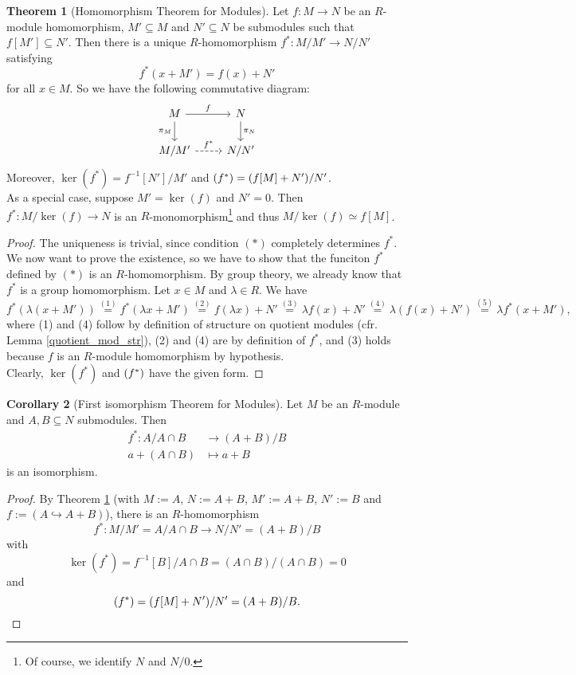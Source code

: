 \documentclass[12pt,a4paper]{report}
\theoremstyle{definition}
\newtheorem{theorem}{Theorem}[chapter] %
\newtheorem{corollary}[theorem]{Corollary} %
\theoremstyle{num.custom-title}
\let\o\relax %
\DeclareMathOperator{\o}{\mathsf{o}}
\let\Im\relax %
\DeclareMathOperator{\Im}{Im}
\DeclareMathOperator{\sse}{\subseteq}
\begin{document}
\begin{theorem}[Homomorphism Theorem for Modules]\label{mod-hom-thm}
Let $f: M \to N$ be an $R$-module homomorphism, $M' \sse M$ and $N' \sse N$ be submodules such that $f[M'] \sse N'$. Then there is a unique $R$-homomorphism  $f^*: M/M' \to N/N'$ satisfying 
\[
f^*(x+M') = f(x)+N' \tag{$*$}
\]
for all $x \in M$. So we have the following commutative diagram:
\[
\begin{tikzcd}
M \arrow{r}{f} \arrow[swap]{d}{\pi_M} & N \arrow{d}{\pi_N} \\
M/M' \arrow[dashrightarrow]{r}{f^*} & N/N' 
\end{tikzcd} 
\]
Moreover, $\ker(f^*) = f^{-1}[N']/M'$ and $\Im(f^*) = (f[M]+N')/N'$.\\
As a special case, suppose $M'=\ker(f)$ and $N'=0$. Then $f^*: M/\ker(f) \to N$ is an $R$-monomorphism\footnote{Of course, we identify $N$ and $N/0$.} and thus $M/\ker(f) \simeq f[M]$.
\begin{proof}
The uniqueness is trivial, since condition $(*)$ completely determines $f^*$.\\
We now want to prove the existence, so we have to show that the funciton $f^*$ defined by $(*)$ is an $R$-homomorphism. By group theory, we already know that $f^*$ is a group homomorphism. Let $x \in M$ and $\lambda \in R$. We have
\[
f^*(\lambda(x+M')) \stackrel{(1)}{=} f^*(\lambda x+M') \stackrel{(2)}{=} f(\lambda x)+N' \stackrel{(3)}{=} \lambda f(x)+N' \stackrel{(4)}{=} \lambda(f(x)+N') \stackrel{(5)}{=} \lambda f^*(x+M'),
\]
where (1) and (4) follow by definition of structure on quotient modules (cfr. Lemma \ref{quotient_mod_str}), (2) and (4) are by definition of $f^*$, and (3) holds because $f$ is an $R$-module homomorphism by hypothesis.\\
Clearly, $\ker(f^*)$ and $\Im(f^*)$ have the given form.
\end{proof}
\end{theorem}

\begin{corollary}[First isomorphism Theorem for Modules]\label{1-iso-thm}
Let $M$ be an $R$-module and $A,B \sse N$ submodules. Then
\begin{align*}
f^* \colon A/A \cap B &\to (A+B)/B \\
a+ (A \cap B) &\mapsto a+B
\end{align*}
is an isomorphism.
\begin{proof}
By Theorem \ref{mod-hom-thm} (with $M:=A$, $N:=A+B$, $M':=A+B$, $N':=B$ and $f := (A \hookrightarrow A+B)$), there is an $R$-homomorphism
\[
f^* \colon M/M' = A/A \cap B \to N/N' = (A+B)/B
\]
with
\[
\ker(f^*) = f^{-1}[B]/A \cap B = (A \cap B) / (A \cap B) = 0
\]
and
\[
\Im(f^*) = (f[M]+N')/N' = (A+B)/B.
\]
\end{proof}
\end{corollary}
\end{document}
